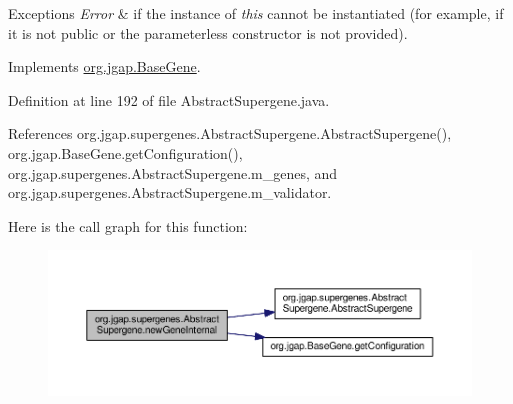 \begin{DoxyExceptions}{Exceptions}
{\em Error} & if the instance of {\itshape this} cannot be instantiated (for example, if it is not public or the parameterless constructor is not provided). \\
\hline
\end{DoxyExceptions}


Implements \hyperlink{classorg_1_1jgap_1_1_base_gene_aa423e96ffac5a9589fb3a4fbda791b3c}{org.\-jgap.\-Base\-Gene}.



Definition at line 192 of file Abstract\-Supergene.\-java.



References org.\-jgap.\-supergenes.\-Abstract\-Supergene.\-Abstract\-Supergene(), org.\-jgap.\-Base\-Gene.\-get\-Configuration(), org.\-jgap.\-supergenes.\-Abstract\-Supergene.\-m\-\_\-genes, and org.\-jgap.\-supergenes.\-Abstract\-Supergene.\-m\-\_\-validator.



Here is the call graph for this function\-:
\nopagebreak
\begin{figure}[H]
\begin{center}
\leavevmode
\includegraphics[width=350pt]{classorg_1_1jgap_1_1supergenes_1_1_abstract_supergene_a1e30b794dee0e8da4d5a4d213e9fb2c1_cgraph}
\end{center}
\end{figure}


